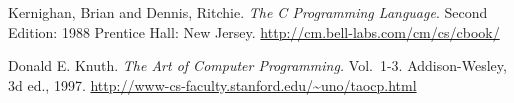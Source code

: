 \begin{thebibliography}{}

 Kernighan, Brian and Dennis, Ritchie.
  \emph{The C Programming Language}.
  Second Edition: 1988
  Prentice Hall: New Jersey.
  \url{http://cm.bell-labs.com/cm/cs/cbook/}

 Donald E. Knuth. 
  \emph{The Art of Computer Programming.}
  Vol.~1-3. Addison-Wesley, 3d ed., 1997.
  \url{http://www-cs-faculty.stanford.edu/~uno/taocp.html}

\end{thebibliography}


